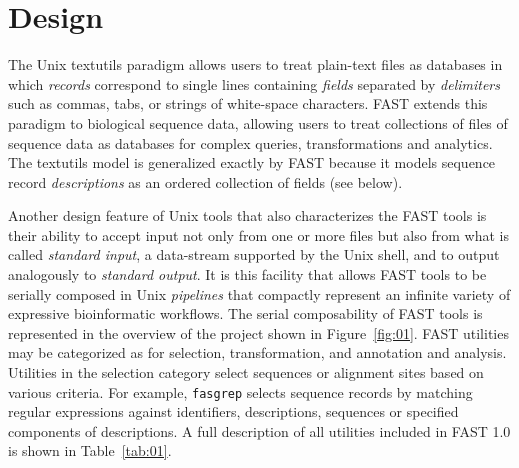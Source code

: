 \documentclass{frontiersSCNS} %
\begin{document}
\section{Design}

The Unix textutils paradigm allows users to treat plain-text files as
databases in which {\it records} correspond to single lines containing
{\it fields} separated by {\it delimiters} such as commas, tabs, or
strings of white-space characters.  FAST extends this paradigm to
biological sequence data, allowing users to treat collections of files
of sequence data as databases for complex queries, transformations and
analytics. The textutils model is generalized exactly by FAST because
it models sequence record {\it descriptions} as an ordered
collection of fields (see below).

Another design feature of Unix tools that also characterizes the FAST
tools is their ability to accept input not only from one or more files
but also from what is called {\it standard input}, a data-stream
supported by the Unix shell, and to output analogously to {\it
  standard output}. It is this facility that allows FAST tools to be
serially composed in Unix {\it pipelines} that compactly represent an
infinite variety of expressive bioinformatic workflows. The serial
composability of FAST tools is represented in the overview of the
project shown in Figure~\ref{fig:01}.  FAST utilities may be
categorized as for selection, transformation, and annotation and
analysis. Utilities in the selection category select sequences or
alignment sites based on various criteria. For example, {\tt fasgrep}
selects sequence records by matching regular expressions against
identifiers, descriptions, sequences or specified components of
descriptions. A full description of all utilities included in FAST 1.0
is shown in Table~\ref{tab:01}.
\end{document}
